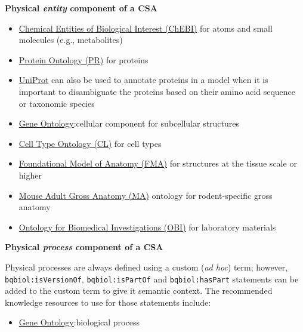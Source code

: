 \documentclass[pdftex,rgb,dvipsnames,svgnames,hyperref,table]{report}
\begin{document}
\textbf {Physical \textit{entity} component of a CSA}
\begin{itemize}
\item \href{https://registry.identifiers.org/registry/chebi}{Chemical Entities of Biological Interest (ChEBI)} for atoms and small molecules (e.g., metabolites)

\item \href{https://registry.identifiers.org/registry/pr}{Protein Ontology (PR)} for proteins

\item \href{https://registry.identifiers.org/registry/uniprot}{UniProt} can also be used to annotate proteins in a model when it is important to disambiguate the proteins based on their amino acid sequence or taxonomic species

\item \href{https://registry.identifiers.org/registry/go}{Gene Ontology}:cellular component for subcellular structures

\item \href{https://registry.identifiers.org/registry/cl}{Cell Type Ontology (CL)} for cell types

\item \href{https://registry.identifiers.org/registry/fma}{Foundational Model of Anatomy (FMA)} for structures at the tissue scale or higher

\item \href{https://registry.identifiers.org/registry/ma}{Mouse Adult Gross Anatomy (MA)} ontology for rodent-specific gross anatomy

\item \href{https://registry.identifiers.org/registry/obi}{Ontology for Biomedical Investigations (OBI)} for laboratory materials
\end{itemize}

\textbf{Physical \textit{process} component of a CSA}

Physical processes are always defined using a custom (\textit{ad hoc}) term; however, \texttt{bqbiol:isVersionOf}, \texttt{bqbiol:isPartOf} and \texttt{bqbiol:hasPart} statements can be added to the custom term to give it semantic context. The recommended knowledge resources to use for those statements include:
\begin{itemize}
\item \href{https://registry.identifiers.org/registry/go}{Gene Ontology}:biological process
\end{itemize}
\end{document}

